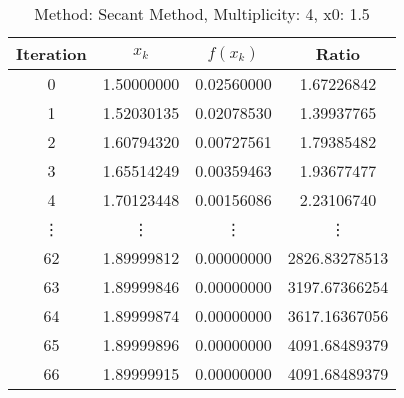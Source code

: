 \begin{table}
\centering
\caption{Method: Secant Method, Multiplicity: 4, x0: 1.5}
\label{tab:table_Secant_Method_4_1_5}
\begin{tabular}{c c c c}
\toprule
Iteration &      $x_k$ &   $f(x_k)$ &         Ratio \\
\midrule
        0 & 1.50000000 & 0.02560000 &    1.67226842 \\
        1 & 1.52030135 & 0.02078530 &    1.39937765 \\
        2 & 1.60794320 & 0.00727561 &    1.79385482 \\
        3 & 1.65514249 & 0.00359463 &    1.93677477 \\
        4 & 1.70123448 & 0.00156086 &    2.23106740 \\
   \vdots &     \vdots &     \vdots &        \vdots \\
       62 & 1.89999812 & 0.00000000 & 2826.83278513 \\
       63 & 1.89999846 & 0.00000000 & 3197.67366254 \\
       64 & 1.89999874 & 0.00000000 & 3617.16367056 \\
       65 & 1.89999896 & 0.00000000 & 4091.68489379 \\
       66 & 1.89999915 & 0.00000000 & 4091.68489379 \\
\bottomrule
\end{tabular}
\end{table}
